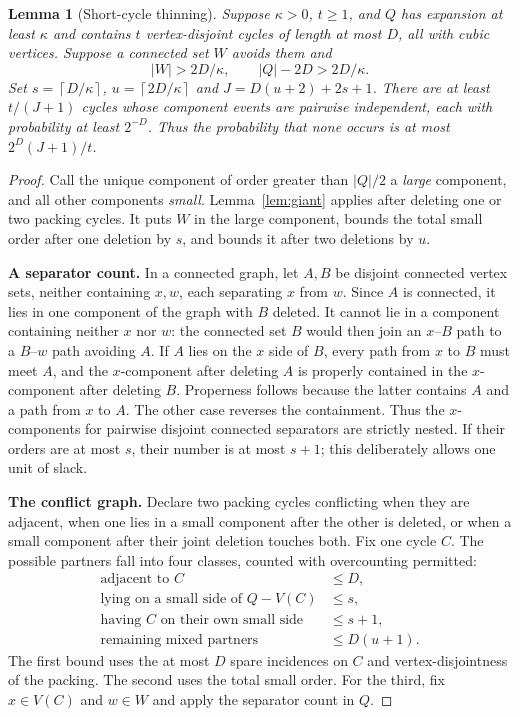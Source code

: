 \documentclass[11pt,a4paper]{article}
\numberwithin{equation}{section}
\newtheorem{lemma}[theorem]{Lemma}
\theoremstyle{definition}
\theoremstyle{remark}
\newcommand{\proofstep}[1]{\par\addvspace{\medskipamount}\noindent\textbf{#1}\enspace\ignorespaces}
\newcommand{\ceil}[1]{\left\lceil#1\right\rceil}
\begin{document}
\begin{lemma}[Short-cycle thinning]\label{lem:short-thinning}
Suppose $\kappa>0$, $t\ge1$, and $Q$ has expansion at least $\kappa$ and contains $t$ vertex-disjoint cycles of length at most $D$, all with cubic vertices. Suppose a connected set $W$ avoids them and
\[
 |W|>2D/\kappa,\qquad |Q|-2D>2D/\kappa.
\]
Set $s=\ceil{D/\kappa}$, $u=\ceil{2D/\kappa}$ and
$J=D(u+2)+2s+1$. There are at least $t/(J+1)$ cycles whose component events are pairwise independent, each with probability at least $2^{-D}$. Thus the probability that none occurs is at most $2^D(J+1)/t$.
\end{lemma}
\begin{proof}
Call the unique component of order greater than $|Q|/2$ a \emph{large} component, and all other components \emph{small}. Lemma~\ref{lem:giant} applies after deleting one or two packing cycles. It puts $W$ in the large component, bounds the total small order after one deletion by $s$, and bounds it after two deletions by $u$.

\proofstep{A separator count.}
In a connected graph, let $A,B$ be disjoint connected vertex sets, neither containing $x,w$, each separating $x$ from $w$. Since $A$ is connected, it lies in one component of the graph with $B$ deleted. It cannot lie in a component containing neither $x$ nor $w$: the connected set $B$ would then join an $x$--$B$ path to a $B$--$w$ path avoiding $A$. If $A$ lies on the $x$ side of $B$, every path from $x$ to $B$ must meet $A$, and the $x$-component after deleting $A$ is properly contained in the $x$-component after deleting $B$. Properness follows because the latter contains $A$ and a path from $x$ to $A$. The other case reverses the containment. Thus the $x$-components for pairwise disjoint connected separators are strictly nested. If their orders are at most $s$, their number is at most $s+1$; this deliberately allows one unit of slack.

\proofstep{The conflict graph.}
Declare two packing cycles conflicting when they are adjacent, when one lies in a small component after the other is deleted, or when a small component after their joint deletion touches both. Fix one cycle $C$. The possible partners fall into four classes, counted with overcounting permitted:
\[
\begin{array}{ll}
\text{adjacent to }C & \le D,\\
\text{lying on a small side of }Q-V(C) & \le s,\\
\text{having }C\text{ on their own small side} & \le s+1,\\
\text{remaining mixed partners} & \le D(u+1).
\end{array}
\]
The first bound uses the at most $D$ spare incidences on $C$ and vertex-disjointness of the packing. The second uses the total small order. For the third, fix $x\in V(C)$ and $w\in W$ and apply the separator count in $Q$.


\end{proof}
\end{document}
